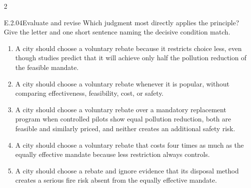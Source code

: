 \documentclass[9pt]{extarticle}
\newcommand{\choice}[1]{\item #1}
\begin{document}
\begin{multicols}{2}
\begin{DenseCoreProblem}{E.2.04}{Evaluate and revise}
Which judgment most directly applies the principle? Give the letter and one short sentence naming the decisive condition match.
\begin{enumerate}[label=(\alph*)]
  \choice{A city should choose a voluntary rebate because it restricts choice less, even though studies predict that it will achieve only half the pollution reduction of the feasible mandate.}
  \choice{A city should choose a voluntary rebate whenever it is popular, without comparing effectiveness, feasibility, cost, or safety.}
  \choice{A city should choose a voluntary rebate over a mandatory replacement program when controlled pilots show equal pollution reduction, both are feasible and similarly priced, and neither creates an additional safety risk.}
  \choice{A city should choose a voluntary rebate that costs four times as much as the equally effective mandate because less restriction always controls.}
  \choice{A city should choose a rebate and ignore evidence that its disposal method creates a serious fire risk absent from the equally effective mandate.}
\end{enumerate}
\end{DenseCoreProblem}
\end{multicols}
\CoreWorkArea
\FormBreak
{}
\end{document}
